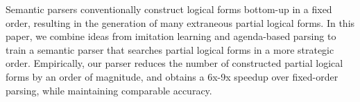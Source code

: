 Semantic parsers conventionally construct logical forms bottom-up in a fixed order, resulting in the generation of many extraneous partial logical forms. In this paper, we combine ideas from imitation learning and agenda-based parsing to train a semantic parser that searches partial logical forms in a more strategic order. Empirically, our parser reduces the number of constructed partial logical forms by an order of magnitude, and obtains a 6x-9x speedup over fixed-order parsing, while maintaining comparable accuracy.